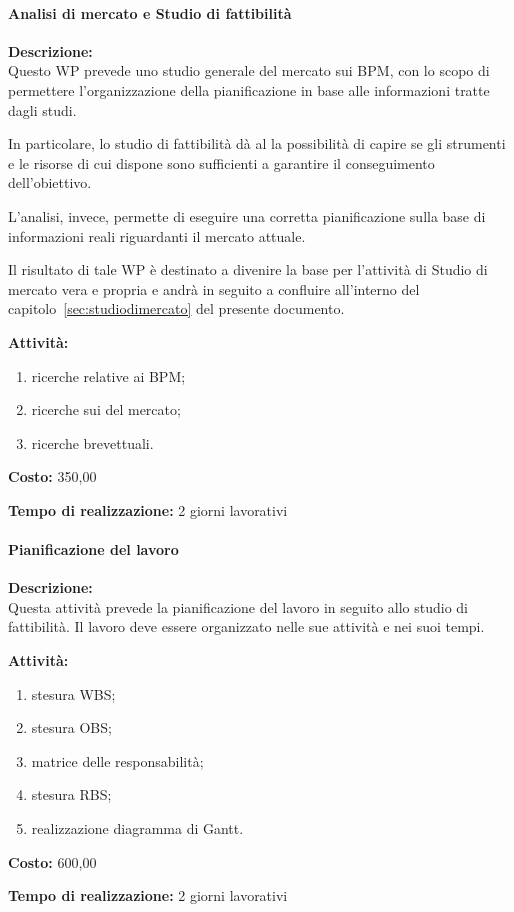 \paragraph{\bfseries\sffamily{}Analisi di mercato e Studio di fattibilità}
\begin{description}
  \item{\bfseries Descrizione:}\\
Questo WP prevede uno studio generale del mercato sui \sw BPM, con lo scopo di permettere l'organizzazione della pianificazione in base alle informazioni tratte dagli studi.
		
In particolare, lo studio di fattibilità dà al  la possibilità di capire se gli strumenti e le risorse di cui dispone sono sufficienti a garantire il conseguimento dell'obiettivo.

L'analisi, invece, permette di eseguire una corretta pianificazione sulla base di informazioni reali riguardanti il mercato attuale. 

Il risultato di tale WP è destinato a divenire la base per l'attività di Studio di mercato vera e propria e andrà in seguito a confluire all'interno del capitolo~\ref{sec:studiodimercato} del presente documento.
\item{\bfseries Attività:}
\begin{enumerate}
   \item ricerche relative ai \sw BPM;
   \item ricerche sui  del mercato;
   \item ricerche brevettuali.
\end{enumerate}
\item{\bfseries Costo:} \text{\euro} 350,00 
\item{\bfseries Tempo di realizzazione:} 2 giorni lavorativi
\end{description}

\paragraph{\bfseries\sffamily{}Pianificazione del lavoro}
\begin{description}
\item{\bfseries Descrizione:}\\
Questa attività prevede la pianificazione del lavoro in seguito allo studio di fattibilità. Il lavoro deve essere organizzato nelle sue attività e nei suoi tempi.
\item{\bfseries Attività:}
\begin{enumerate}
	\item stesura WBS;
	\item stesura OBS;
	\item matrice delle responsabilità;
	\item stesura RBS;
	\item realizzazione diagramma di Gantt.
\end{enumerate}
\item{\bfseries Costo:} \text{\euro} 600,00 
\item{\bfseries Tempo di realizzazione:} 2 giorni lavorativi
\end{description}

